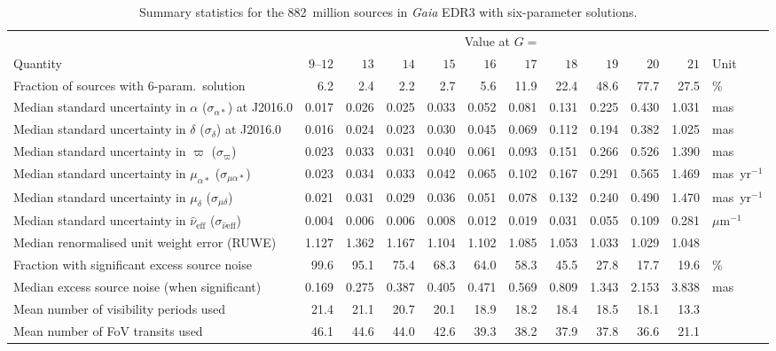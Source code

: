 \documentclass[longauth]{aa} %
\begin{document}
\begin{table}[t]
\caption{Summary statistics for the 882~million sources in \textit{Gaia} EDR3 
with six-parameter solutions.
\label{tab:statP6}}
\small   \setlength{\tabcolsep}{4.5pt}
\begin{tabular}{lrrrrrrrrrrl}
\hline\hline
\noalign{\smallskip}
& \multicolumn{10}{c}{Value at $G=$} \\
Quantity & $9$--$12$& $13$ & $14$ & $15$ & $16$ & $17$ & $18$ & $19$ & $20$ & $21$ & Unit \\
\noalign{\smallskip}\hline\noalign{\smallskip}
Fraction of sources with 6-param.\ solution &  6.2&  2.4&  2.2&  2.7&  5.6& 11.9& 22.4& 48.6& 77.7& 27.5& \% \\
Median standard uncertainty in $\alpha$ ($\sigma_{\alpha*}$) at J2016.0 & 0.017& 0.026& 0.025& 0.033& 0.052& 0.081& 0.131& 0.225& 0.430& 1.031& mas \\
Median standard uncertainty in $\delta$ ($\sigma_{\delta}$) at J2016.0 & 0.016& 0.024& 0.023& 0.030& 0.045& 0.069& 0.112& 0.194& 0.382& 1.025& mas \\
Median standard uncertainty in $\varpi$ ($\sigma_{\varpi}$) & 0.023& 0.033& 0.031& 0.040& 0.061& 0.093& 0.151& 0.266& 0.526& 1.390& mas \\
Median standard uncertainty in $\mu_{\alpha*}$ ($\sigma_{\mu\alpha*}$) & 0.023& 0.034& 0.033& 0.042& 0.065& 0.102& 0.167& 0.291& 0.565& 1.469& mas~yr$^{-1}$ \\
Median standard uncertainty in $\mu_{\delta}$ ($\sigma_{\mu\delta}$) & 0.021& 0.031& 0.029& 0.036& 0.051& 0.078& 0.132& 0.240& 0.490& 1.470& mas~yr$^{-1}$ \\
Median standard uncertainty in $\hat{\nu}_\text{eff}$ ($\sigma_{\hat{\nu}\text{eff}}$) & 0.004& 0.006& 0.006& 0.008& 0.012& 0.019& 0.031& 0.055& 0.109& 0.281& $\mu$m$^{-1}$ \\
Median renormalised unit weight error (RUWE) & 1.127& 1.362& 1.167& 1.104& 1.102& 1.085& 1.053& 1.033& 1.029& 1.048&   \\
Fraction with significant excess source noise & 99.6& 95.1& 75.4& 68.3& 64.0& 58.3& 45.5& 27.8& 17.7& 19.6& \% \\
Median excess source noise (when significant) & 0.169& 0.275& 0.387& 0.405& 0.471& 0.569& 0.809& 1.343& 2.153& 3.838& mas \\
Mean number of visibility periods used & 21.4& 21.1& 20.7& 20.1& 18.9& 18.2& 18.4& 18.5& 18.1& 13.3&   \\
Mean number of FoV transits used & 46.1& 44.6& 44.0& 42.6& 39.3& 38.2& 37.9& 37.8& 36.6& 21.1&   \\

\end{tabular}
\end{table}
\end{document}
